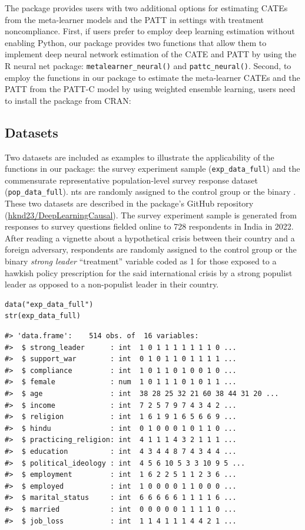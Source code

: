 The  package provides users with two additional
options for estimating CATEs from the meta-learner models and the PATT
in settings with treatment noncompliance. First, if users prefer to
employ deep learning estimation without enabling Python, our package
provides two functions that allow them to implement deep neural network
estimation of the CATE and PATT by using the R neural net package:
\texttt{metalearner\_neural()} and \texttt{pattc\_neural()}. Second, to employ the
functions in our package to estimate the meta-learner CATEs and the PATT
from the PATT-C model by using weighted ensemble learning, users need to
install the  package from CRAN:

\subsection{Datasets}\label{datasets}

Two datasets are included as examples to illustrate the applicability
of the functions in our package: the survey experiment sample
(\texttt{exp\_data\_full}) and the commensurate representative population-level
survey response dataset (\texttt{pop\_data\_full}). nts are randomly assigned to
the control group or the binary . These two datasets are described in
the package's GitHub repository
(\href{https://github.com/hknd23/DeepLearningCausal}{hknd23/DeepLearningCausal}).
The survey experiment sample is generated from responses to survey
questions fielded online to 728 respondents in India in 2022. After
reading a vignette about a hypothetical crisis between their country and
a foreign adversary, respondents are randomly assigned to the control
group or the binary \emph{strong leader} ``treatment'' variable coded as 1 for
those exposed to a hawkish policy prescription for the said
international crisis by a strong populist leader as opposed to a
non-populist leader in their country.

\begin{verbatim}
data("exp_data_full") 
str(exp_data_full) 
\end{verbatim}

\begin{verbatim}
#> 'data.frame':    514 obs. of  16 variables:
#>  $ strong_leader      : int  1 0 1 1 1 1 1 1 1 0 ...
#>  $ support_war        : int  0 1 0 1 1 0 1 1 1 1 ...
#>  $ compliance         : int  1 0 1 1 0 1 0 0 1 0 ...
#>  $ female             : num  1 0 1 1 1 0 1 0 1 1 ...
#>  $ age                : int  38 28 25 32 21 60 38 44 31 20 ...
#>  $ income             : int  7 2 5 7 9 7 4 3 4 2 ...
#>  $ religion           : int  1 6 1 9 1 6 5 6 6 9 ...
#>  $ hindu              : int  0 1 0 0 0 1 0 1 1 0 ...
#>  $ practicing_religion: int  4 1 1 1 4 3 2 1 1 1 ...
#>  $ education          : int  4 3 4 4 8 7 4 3 4 4 ...
#>  $ political_ideology : int  4 5 6 10 5 3 3 10 9 5 ...
#>  $ employment         : int  1 6 2 2 5 1 1 2 3 6 ...
#>  $ employed           : int  1 0 0 0 0 1 1 0 0 0 ...
#>  $ marital_status     : int  6 6 6 6 6 1 1 1 1 6 ...
#>  $ married            : int  0 0 0 0 0 1 1 1 1 0 ...
#>  $ job_loss           : int  1 1 4 1 1 1 4 4 2 1 ...
\end{verbatim}

